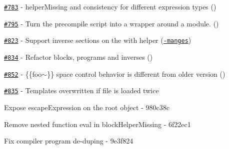 \begin{DoxyItemize}
\item \href{https://github.com/wycats/handlebars.js/issues/783}{\tt \#783} -\/ helper\+Missing and consistency for different expression types (\href{https://api.github.com/users/ErisDS}{\tt })
\item \href{https://github.com/wycats/handlebars.js/pull/795}{\tt \#795} -\/ Turn the precompile script into a wrapper around a module. (\href{https://api.github.com/users/jwietelmann}{\tt })
\item \href{https://github.com/wycats/handlebars.js/pull/823}{\tt \#823} -\/ Support inverse sections on the with helper (\href{https://api.github.com/users/dan-manges}{\tt -\/manges})
\item \href{https://github.com/wycats/handlebars.js/pull/834}{\tt \#834} -\/ Refactor blocks, programs and inverses (\href{https://api.github.com/users/mmun}{\tt })
\item \href{https://github.com/wycats/handlebars.js/issues/852}{\tt \#852} -\/ \{\{foo$\sim$\}\} space control behavior is different from older version (\href{https://api.github.com/users/zordius}{\tt })
\item \href{https://github.com/wycats/handlebars.js/issues/835}{\tt \#835} -\/ Templates overwritten if file is loaded twice
\item Expose escape\+Expression on the root object -\/ 980c38c
\item Remove nested function eval in block\+Helper\+Missing -\/ 6f22ec1
\item Fix compiler program de-\/duping -\/ 9e3f824
\end{DoxyItemize}

